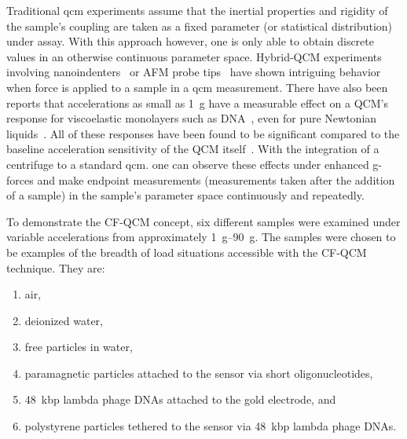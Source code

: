 Traditional \gls{qcm} experiments assume that the inertial properties and
rigidity of the sample's coupling are taken as a fixed parameter (or
statistical distribution) under assay.  With this approach however, one is
only able to obtain discrete values in an otherwise continuous parameter
space.  Hybrid-QCM experiments involving
nanoindenters~\cite{borovsky2001measuring} or AFM probe
tips~\cite{richter2003pathways} have shown intriguing behavior when force
is applied to a sample in a \gls{qcm} measurement.  There have also been reports
that accelerations as small as \SI{1}{g} have a measurable effect on a
QCM's response for viscoelastic monolayers such as
DNA~\cite{fawcett2004evidence}, even for pure Newtonian
liquids~\cite{yoshimoto2002effect}.  All of these responses have been found
to be significant compared to the baseline acceleration sensitivity of the
QCM itself~\cite{filler1988acceleration}.  With the integration of a
centrifuge to a standard \gls{qcm}. one can observe these effects under enhanced
g-forces and make endpoint measurements (measurements taken after the
addition of a sample) in the sample's parameter space continuously and
repeatedly.

To demonstrate the CF-QCM concept, six different samples were examined
under variable accelerations from approximately \SIrange{1}{90}{g}.  The
samples were chosen to be examples of the breadth of load situations
accessible with the CF-QCM technique.  They are:
\begin{enumerate}
  \item air,
  \item deionized water,
  \item free particles in water,
  \item paramagnetic particles attached to the sensor via short oligonucleotides,
  \item \SI{48}{kbp} lambda phage DNAs attached to the gold electrode, and
  \item polystyrene particles tethered to the sensor via \SI{48}{kbp} lambda phage DNAs.
\end{enumerate}

